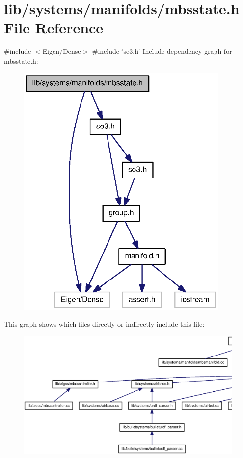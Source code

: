 \section{lib/systems/manifolds/mbsstate.h \-File \-Reference}
\label{mbsstate_8h}
{\ttfamily \#include $<$\-Eigen/\-Dense$>$}\*
{\ttfamily \#include \char`\"{}se3.\-h\char`\"{}}\*
\-Include dependency graph for mbsstate.\-h\-:\nopagebreak
\begin{figure}[H]
\begin{center}
\leavevmode
\includegraphics[width=297pt]{mbsstate_8h__incl}
\end{center}
\end{figure}
\-This graph shows which files directly or indirectly include this file\-:
\nopagebreak
\begin{figure}[H]
\begin{center}
\leavevmode
\includegraphics[width=350pt]{mbsstate_8h__dep__incl}
\end{center}
\end{figure}
